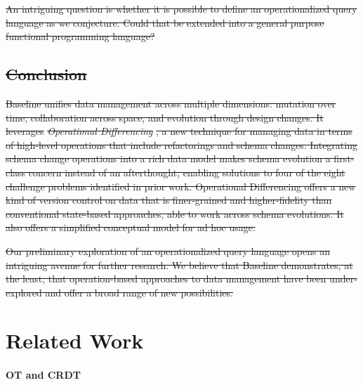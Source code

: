 \documentclass[english,submission]{programming}
\theoremstyle{definition}
\newcommand{\myparagraph}[1]{\vspace{-8pt}\paragraph{#1}} %
\providecommand{\DIFdel}[1]{{\protect\color{red}\sout{#1}}} %
\providecommand{\DIFaddbegin}{} %
\providecommand{\DIFaddend}{} %
\providecommand{\DIFdelbegin}{} %
\providecommand{\DIFdelend}{} %
\begin{document}
\DIFdelbegin \DIFdel{An intriguing question is whether it is possible to define an operationalized query language as we conjecture. Could that be extended into a general purpose functional programming language?
}%

\DIFdelend %


\DIFdelbegin \subsection{\DIFdel{Conclusion}}
\addtocounter{subsection}{-1}%

\DIFdel{Baseline unifies data management across multiple dimensions: mutation over time, collaboration across space, and evolution through design changes. It leverages }\textit{\DIFdel{Operational Differencing}}%
\DIFdel{, a new technique for managing data in terms of high-level operations that include refactorings and schema changes. Integrating schema change operations into a rich data model makes schema evolution a first-class concern instead of an afterthought, enabling solutions to four of the eight challenge problems identified in prior work.
Operational Differencing offers a new kind of version control on data that is finer-grained and higher-fidelity than conventional state-based approaches, able to work across schema evolutions. It also offers a simplified conceptual model for ad hoc usage. }%

\DIFdel{Our preliminary exploration of an operationalized query language opens an intriguing avenue for further research. We believe that Baseline demonstrates, at the least, that operation-based approaches to data management have been under-explored and offer a broad range of new possibilities.
}%

\DIFdelend \section{Related Work}

\DIFaddbegin \myparagraph{OT and CRDT}
\DIFaddend 
\end{document}
